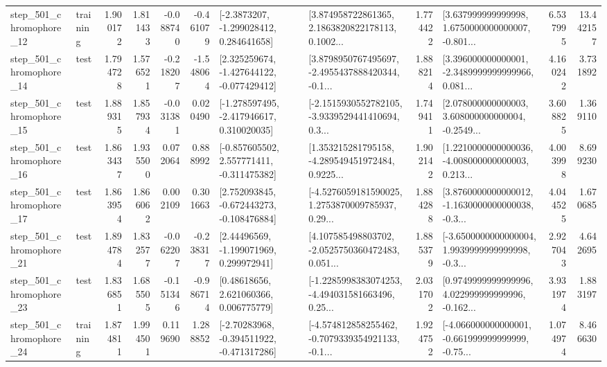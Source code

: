 \begin{tabular}{llrrrrllrlrr}
  step\_501\_chromophore\_12 &  training &      1.900172 &    1.811433 &     -0.088740 & -0.461079 &     [-2.3873207, -1.299028412, 0.284641658] &  [3.874958722861365, 2.1863820822178113, 0.1002... &       1.774422 &  [3.637999999999998, 1.6750000000000007, -0.801... &            6.537995 &         13.442157 \\
  step\_501\_chromophore\_14 &      test &      1.794728 &    1.576521 &     -0.218207 & -1.548064 &   [2.325259674, -1.427644122, -0.077429412] &  [3.8798950767495697, -2.4955437888420344, -0.1... &       1.888214 &  [3.396000000000001, -2.3489999999999966, 0.081... &            4.160242 &          3.731892 \\
  step\_501\_chromophore\_15 &      test &      1.889315 &    1.857934 &     -0.031381 &  0.020490 &   [-1.278597495, -2.417946617, 0.310020035] &  [-2.1515930552782105, -3.9339529441410694, 0.3... &       1.749411 &  [2.078000000000003, 3.608000000000004, -0.2549... &            3.608825 &          1.369110 \\
  step\_501\_chromophore\_16 &      test &      1.863437 &    1.935500 &      0.072064 &  0.888992 &   [-0.857605502, 2.557771411, -0.311475382] &  [1.353215281795158, -4.289549451972484, 0.9225... &       1.902142 &  [1.2210000000000036, -4.008000000000003, 0.213... &            4.003998 &          8.699230 \\
  step\_501\_chromophore\_17 &      test &      1.863954 &    1.866062 &      0.002109 &  0.301663 &   [2.752093845, -0.672443273, -0.108476884] &  [-4.5276059181590025, 1.2753870009785937, 0.29... &       1.884288 &  [3.8760000000000012, -1.1630000000000038, -0.3... &            4.044525 &          1.670685 \\
  step\_501\_chromophore\_21 &      test &      1.894784 &    1.832577 &     -0.062207 & -0.238317 &     [2.44496569, -1.199071969, 0.299972941] &  [4.107585498803702, -2.0525750360472483, 0.051... &       1.885379 &  [-3.6500000000000004, 1.9939999999999998, -0.3... &            2.927043 &          4.642695 \\
  step\_501\_chromophore\_23 &      test &      1.836851 &    1.685505 &     -0.151346 & -0.986714 &      [0.48618656, 2.621060366, 0.006775779] &  [-1.2285998383074253, -4.494031581663496, 0.25... &       2.031702 &  [0.9749999999999996, 4.022999999999996, -0.162... &            3.931974 &          1.883197 \\
  step\_501\_chromophore\_24 &  training &      1.874811 &    1.994501 &      0.119690 &  1.288852 &   [-2.70283968, -0.394511922, -0.471317286] &  [-4.574812858255462, -0.7079339354921133, -0.1... &       1.924752 &  [-4.066000000000001, -0.661999999999999, -0.75... &            1.074974 &          8.466630 \\

\end{tabular}
